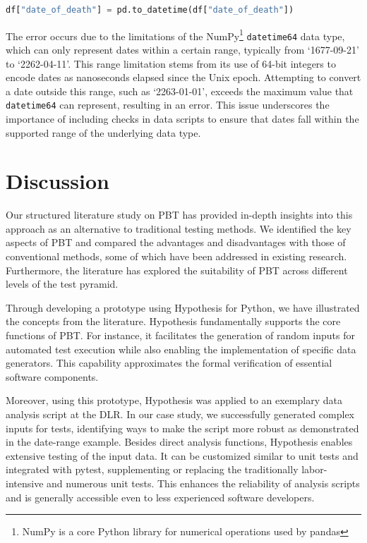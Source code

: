 \documentclass[runningheads]{llncs}
\begin{document}
\begin{lstlisting}[language=Python,caption={Trace Out Of Bounds Error from \texttt{data\_analysis.ipynb}},label=lst:bounds_err,firstnumber=10]
df["date_of_death"] = pd.to_datetime(df["date_of_death"])
\end{lstlisting}
The error occurs due to the limitations of the NumPy\footnote{NumPy is a core Python library for numerical operations used by pandas} \texttt{datetime64} data type, which can only represent dates within a certain range, typically from `1677-09-21' to `2262-04-11'. This range limitation stems from its use of 64-bit integers to encode dates as nanoseconds elapsed since the Unix epoch. Attempting to convert a date outside this range, such as `2263-01-01', exceeds the maximum value that \texttt{datetime64} can represent, resulting in an error. This issue underscores the importance of including checks in data scripts to ensure that dates fall within the supported range of the underlying data type.

\section{Discussion}
Our structured literature study on PBT has provided in-depth insights into this approach as an alternative to traditional testing methods. We identified the key aspects of PBT and compared the advantages and disadvantages with those of conventional methods, some of which have been addressed in existing research. Furthermore, the literature has explored the suitability of PBT across different levels of the test pyramid.

Through developing a prototype using Hypothesis for Python, we have illustrated the concepts from the literature. Hypothesis fundamentally supports the core functions of PBT. For instance, it facilitates the generation of random inputs for automated test execution while also enabling the implementation of specific data generators. This capability approximates the formal verification of essential software components.

Moreover, using this prototype, Hypothesis was applied to an exemplary data analysis script at the DLR. In our case study, we successfully generated complex inputs for tests, identifying ways to make the script more robust as demonstrated in the date-range example. Besides direct analysis functions, Hypothesis enables extensive testing of the input data. It can be customized similar to unit tests and integrated with pytest, supplementing or replacing the traditionally labor-intensive and numerous unit tests. This enhances the reliability of analysis scripts and is generally accessible even to less experienced software developers.
\end{document}
